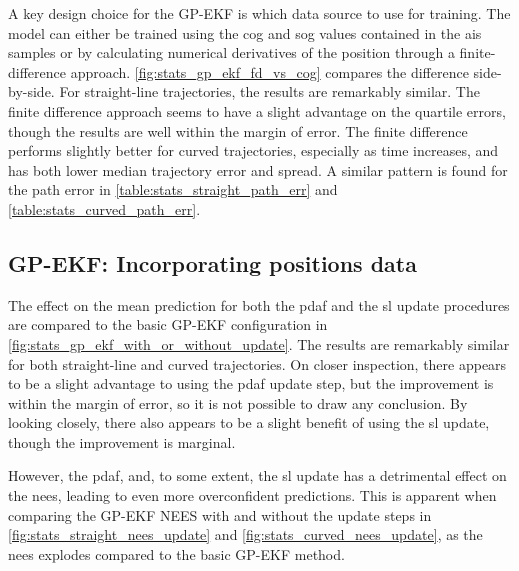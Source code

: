 A key design choice for the GP-EKF is which data source to use for training. The model can either be trained using the \acrshort{cog} and \acrshort{sog} values contained in the \acrshort{ais} samples or by calculating numerical derivatives of the position through a finite-difference approach. \cref{fig:stats_gp_ekf_fd_vs_cog} compares the difference side-by-side. For straight-line trajectories, the results are remarkably similar. The finite difference approach seems to have a slight advantage on the quartile errors, though the results are well within the margin of error. The finite difference performs slightly better for curved trajectories, especially as time increases, and has both lower median trajectory error and spread. A similar pattern is found for the path error in \cref{table:stats_straight_path_err} and \cref{table:stats_curved_path_err}.

\subsection{GP-EKF: Incorporating positions data}
The effect on the mean prediction for both the \acrshort{pdaf} and the \acrshort{sl} update procedures are compared to the basic GP-EKF configuration in \cref{fig:stats_gp_ekf_with_or_without_update}. The results are remarkably similar for both straight-line and curved trajectories. On closer inspection, there appears to be a slight advantage to using the \acrshort{pdaf} update step, but the improvement is within the margin of error, so it is not possible to draw any conclusion. By looking closely, there also appears to be a slight benefit of using the \acrshort{sl} update, though the improvement is marginal.

However, the \acrshort{pdaf}, and, to some extent, the \acrshort{sl} update has a detrimental effect on the \acrshort{nees}, leading to even more overconfident predictions. This is apparent when comparing the GP-EKF NEES with and without the update steps in \cref{fig:stats_straight_nees_update} and \cref{fig:stats_curved_nees_update}, as the \acrshort{nees} explodes compared to the basic GP-EKF method.










